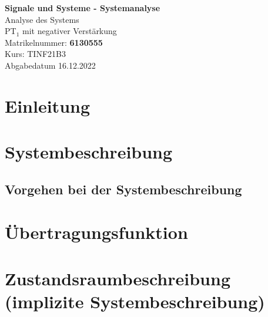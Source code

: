 \documentclass[
  ngerman
  ,12pt
  ,pdftex
]{article}
\begin{document}
\begin{titlepage}
  \begin{center}
      {\Huge \textbf{Signale und Systeme - Systemanalyse}}\\[1.5cm]
      {\Large Analyse des Systems}\\[1cm]
      {\Huge PT$_{1}$ mit negativer Verstärkung}\\[7cm]
      {\large Matrikelnummer: \textbf{6130555}}\\[0.5cm]
      {\large Kurs: TINF21B3}\\[0.5cm]
      {\large Abgabedatum 16.12.2022}
      \vfill
  \end{center}
\end{titlepage}
\newpage
\tableofcontents
\newpage



\section{Einleitung}    %

\vspace*{1cm}

\section{Systembeschreibung}    %
\subsection{Vorgehen bei der Systembeschreibung}


\vspace*{1cm}


\section{Übertragungsfunktion}    %

\vspace*{1cm}


\section{Zustandsraumbeschreibung (implizite Systembeschreibung)}

\vspace*{1cm}
\end{document}
